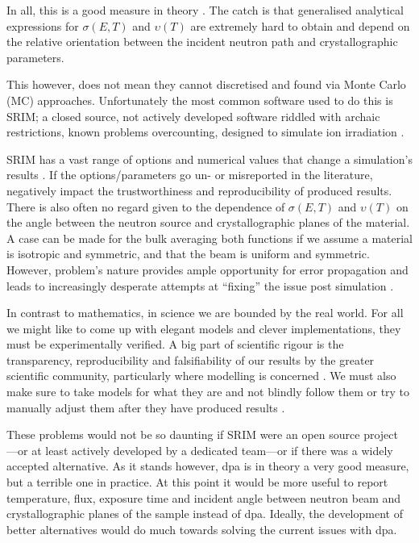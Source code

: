 \documentclass[12pt, a4paper]{article}
\begin{document}
		In all, this is a good measure in theory \cite{dpa}. The catch is that generalised analytical expressions for $\sigma (E,T)$ and $\upsilon (T)$ are extremely hard to obtain and depend on the relative orientation between the incident neutron path and crystallographic parameters.
		
		This however, does not mean they cannot discretised and found via Monte Carlo (MC) approaches. Unfortunately the most common software used to do this is SRIM; a closed source, not actively developed software riddled with archaic restrictions, known problems overcounting, designed to simulate ion irradiation \cite{srim,srimisbad,dpa}.
		
		SRIM has a vast range of options and numerical values that change a simulation's results \cite{srim}. If the options/parameters go un- or misreported in the literature, negatively impact the trustworthiness and reproducibility of produced results. There is also often no regard given to the dependence of $\sigma (E,T)$ and $\upsilon (T)$ on the angle between the neutron source and crystallographic planes of the material. A case can be made for the bulk averaging both functions if we assume a material is isotropic and symmetric, and that the beam is uniform and symmetric. However, problem's nature provides ample opportunity for error propagation and leads to increasingly desperate attempts at ``fixing'' the issue post simulation \cite{srimisbad}.
		
		In contrast to mathematics, in science we are bounded by the real world. For all we might like to come up with elegant models and clever implementations, they must be experimentally verified. A big part of scientific rigour is the transparency, reproducibility and falsifiability of our results by the greater scientific community, particularly where modelling is concerned \cite{transparency}. We must also make sure to take models for what they are and not blindly follow them or try to manually adjust them after they have produced results \cite{error}.
		
		These problems would not be so daunting if SRIM were an open source project \cite{openvsclosed}---or at least actively developed by a dedicated team---or if there was a widely accepted alternative. As it stands however, dpa is in theory a very good measure, but a terrible one in practice. At this point it would be more useful to report temperature, flux, exposure time and incident angle between neutron beam and crystallographic planes of the sample instead of dpa. Ideally, the development of better alternatives would do much towards solving the current issues with dpa.
\end{document}
